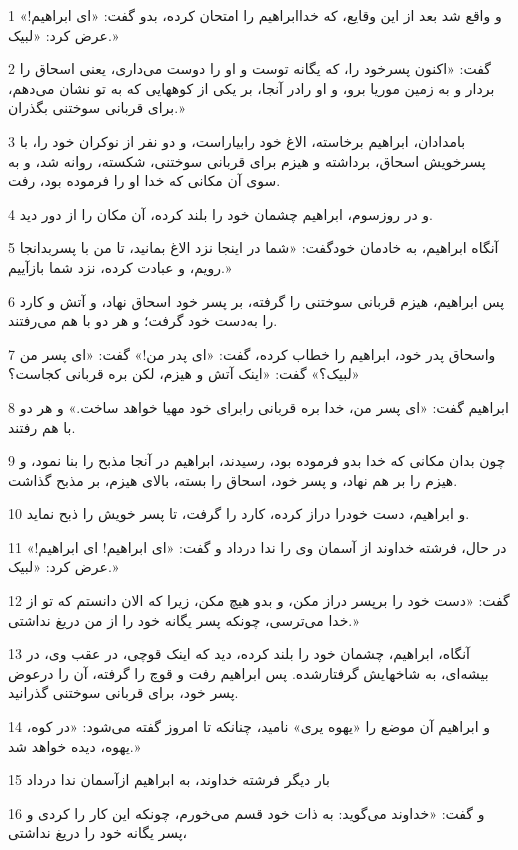 \par 1 و واقع شد بعد از این وقایع، که خداابراهیم را امتحان کرده، بدو گفت: «ای ابراهیم!» عرض کرد: «لبیک.»
\par 2 گفت: «اکنون پسرخود را، که یگانه توست و او را دوست می‌داری، یعنی اسحاق را بردار و به زمین موریا برو، و او رادر آنجا، بر یکی از کوههایی که به تو نشان می‌دهم، برای قربانی سوختنی بگذران.»
\par 3 بامدادان، ابراهیم برخاسته، الاغ خود رابیاراست، و دو نفر از نوکران خود را، با پسرخویش اسحاق، برداشته و هیزم برای قربانی سوختنی، شکسته، روانه شد، و به سوی آن مکانی که خدا او را فرموده بود، رفت.
\par 4 و در روزسوم، ابراهیم چشمان خود را بلند کرده، آن مکان را از دور دید.
\par 5 آنگاه ابراهیم، به خادمان خودگفت: «شما در اینجا نزد الاغ بمانید، تا من با پسربدانجا رویم، و عبادت کرده، نزد شما بازآییم.»
\par 6 پس ابراهیم، هیزم قربانی سوختنی را گرفته، بر پسر خود اسحاق نهاد، و آتش و کارد را به‌دست خود گرفت؛ و هر دو با هم می‌رفتند.
\par 7 واسحاق پدر خود، ابراهیم را خطاب کرده، گفت: «ای پدر من!» گفت: «ای پسر من لبیک؟» گفت: «اینک آتش و هیزم، لکن بره قربانی کجاست؟»
\par 8 ابراهیم گفت: «ای پسر من، خدا بره قربانی رابرای خود مهیا خواهد ساخت.» و هر دو با هم رفتند.
\par 9 چون بدان مکانی که خدا بدو فرموده بود، رسیدند، ابراهیم در آنجا مذبح را بنا نمود، و هیزم را بر هم نهاد، و پسر خود، اسحاق را بسته، بالای هیزم، بر مذبح گذاشت.
\par 10 و ابراهیم، دست خودرا دراز کرده، کارد را گرفت، تا پسر خویش را ذبح نماید.
\par 11 در حال، فرشته خداوند از آسمان وی را ندا درداد و گفت: «ای ابراهیم! ای ابراهیم!» عرض کرد: «لبیک.»
\par 12 گفت: «دست خود را برپسر دراز مکن، و بدو هیچ مکن، زیرا که الان دانستم که تو از خدا می‌ترسی، چونکه پسر یگانه خود را از من دریغ نداشتی.»
\par 13 آنگاه، ابراهیم، چشمان خود را بلند کرده، دید که اینک قوچی، در عقب وی، در بیشه‌ای، به شاخهایش گرفتارشده. پس ابراهیم رفت و قوچ را گرفته، آن را درعوض پسر خود، برای قربانی سوختنی گذرانید.
\par 14 و ابراهیم آن موضع را «یهوه یری» نامید، چنانکه تا امروز گفته می‌شود: «در کوه، یهوه، دیده خواهد شد.»
\par 15 بار دیگر فرشته خداوند، به ابراهیم ازآسمان ندا در‌داد
\par 16 و گفت: «خداوند می‌گوید: به ذات خود قسم می‌خورم، چونکه این کار را کردی و پسر یگانه خود را دریغ نداشتی،
